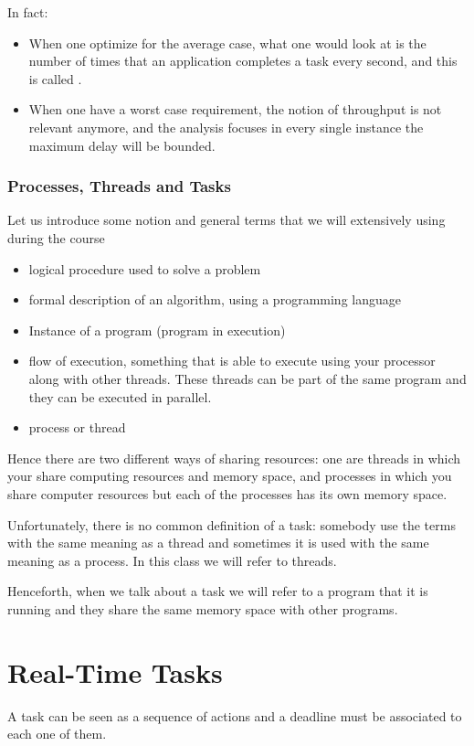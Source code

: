 In fact:
\begin{itemize}
\item When one optimize for the average case, what one would look at is the number of times that an application completes a task every second, and this is called .
\item When one have a worst case requirement, the notion of throughput is not relevant anymore, and the analysis focuses in every single instance the maximum delay will be bounded.
\end{itemize}

\subsubsection{Processes, Threads and Tasks}
Let us introduce some notion and general terms that we will extensively using during the course
\begin{itemize}
\item{logical procedure used to solve a problem}
\item{formal description of an algorithm, using a programming language}
\item{Instance of a program (program in execution)}
\item{flow of execution, something that is able to execute using your processor along with other threads. These threads can be part of the same program and they can be executed in parallel.}
\item{process or thread}
\end{itemize}

Hence there are two different ways of sharing resources: one are threads in which your share computing resources and memory space, and processes in which you share computer resources but each of the processes has its own memory space.

Unfortunately, there is no common definition of a task: somebody use the terms with the same meaning as a thread and sometimes it is used with the same meaning as a process. In this class we will refer to threads.

Henceforth, when we talk about a task we will refer to a program that it is running and they share the same memory space with other programs.

\section{Real-Time Tasks}
A task can be seen as a sequence of actions and a deadline must be associated to each one of them.


